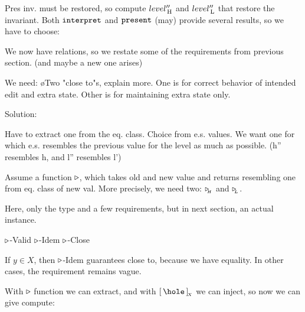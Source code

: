 Pres inv. must be restored, so compute $level''_{\, \mathrm H}$ and $level''_{\, \mathrm L}$ that restore the invariant. 
Both ${\tt interpret}$ and ${\tt present}$ (may) provide several results, so we have to choose:

We now have relations, so we restate some of the requirements from previous section. (and maybe a new one arises)

We need:
\bl
\o Two "close to"s, explain more. One is for correct behavior of intended edit and extra state. Other is for maintaining extra state only.
\el


Solution:

Have to extract one from the eq. class. Choice from e.s. values. We want one for which e.s. resembles the previous value for the level as much as possible. (h'' resembles h, and l'' resembles l')

Assume a function $\triangleright$, which takes old and new value and returns resembling one from eq. class of new val. More precisely, we need two: $\triangleright_{_{\!\!H}}$ and $\triangleright_{_{\!\!L}}$. 


Here, only the type and a few requirements, but in next section, an actual instance.



			{$\triangleright$-Valid} 
	{$\triangleright$-Idem} 
		{$\triangleright$-Close} 

If $y \in X$, then {\sc $\triangleright$-Idem} guarantees close to, because we have equality. In other cases, the requirement remains vague.


With $\triangleright$ function we can extract, and with $\eqcl{\hole}{X}$ we can inject, so now we can give compute:

